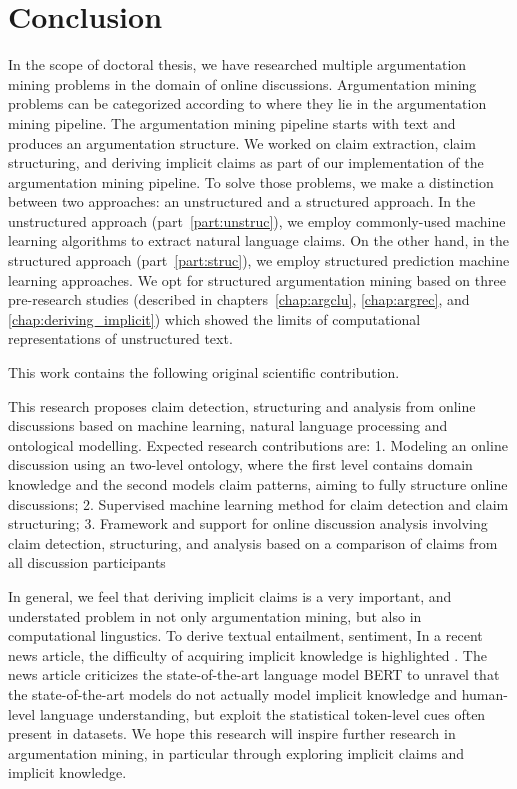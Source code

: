 \chapter{Conclusion}
\label{chap:conclusion}

In the scope of doctoral thesis, we have researched multiple argumentation
mining problems in the domain of online discussions.  Argumentation mining
problems can be categorized according to where they lie in the argumentation
mining pipeline. The argumentation mining pipeline starts with text and
produces an argumentation structure. 
We worked on claim extraction, claim
structuring, and deriving implicit claims as part of our implementation of the
argumentation mining pipeline. To solve those problems, we make a distinction
between two approaches: an unstructured and a structured approach. In the
unstructured approach (part~\ref{part:unstruc}), we employ commonly-used machine
learning algorithms to extract natural language claims. On the other hand, in
the structured approach (part~\ref{part:struc}), we employ structured prediction
machine learning approaches. 
We opt for structured argumentation mining based on three pre-research studies
(described in chapters~\ref{chap:argclu}, \ref{chap:argrec}, and
\ref{chap:deriving_implicit}) which showed the limits of computational
representations of unstructured text. 

This work contains the following original scientific contribution. 

This research proposes claim detection, structuring and analysis from online
discussions based on machine learning, natural language processing and
ontological modelling. Expected research contributions are: 1. Modeling an
online discussion using an two-level ontology, where the first level contains
domain knowledge and the second models claim patterns, aiming to fully
structure online discussions; 2. Supervised machine learning method for claim
detection and claim structuring; 3. Framework and support for online discussion
analysis involving claim detection, structuring, and analysis based on a
comparison of claims from all discussion participants



In general, we feel that deriving implicit claims is a very important, and
understated problem in not only argumentation mining, but also in computational
lingustics. To derive textual entailment, sentiment, In a recent news article,
the difficulty of acquiring implicit knowledge is highlighted
\citep{gradientpub}.  The news article criticizes the state-of-the-art language
model BERT \citep{devlin2018bert} to unravel that the state-of-the-art models
do not actually model implicit knowledge and human-level language
understanding, but exploit the statistical token-level cues often present in
datasets. We hope this research will inspire further research in argumentation
mining, in particular through exploring implicit claims and implicit knowledge. 
